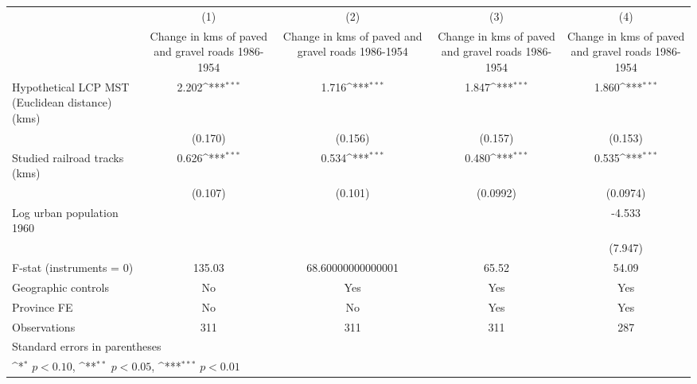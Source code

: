 {
\def\sym#1{\ifmmode^{#1}\else\(^{#1}\)\fi}
\begin{tabular}{l*{4}{c}}
\hline\hline
                &\multicolumn{1}{c}{(1)}&\multicolumn{1}{c}{(2)}&\multicolumn{1}{c}{(3)}&\multicolumn{1}{c}{(4)}\\
                &\multicolumn{1}{c}{Change in kms of paved and gravel roads 1986-1954}&\multicolumn{1}{c}{Change in kms of paved and gravel roads 1986-1954}&\multicolumn{1}{c}{Change in kms of paved and gravel roads 1986-1954}&\multicolumn{1}{c}{Change in kms of paved and gravel roads 1986-1954}\\
\hline
Hypothetical LCP MST (Euclidean distance)(kms)&    2.202\sym{***}&    1.716\sym{***}&    1.847\sym{***}&    1.860\sym{***}\\
                &  (0.170)         &  (0.156)         &  (0.157)         &  (0.153)         \\
[1em]
Studied railroad tracks (kms)&    0.626\sym{***}&    0.534\sym{***}&    0.480\sym{***}&    0.535\sym{***}\\
                &  (0.107)         &  (0.101)         & (0.0992)         & (0.0974)         \\
[1em]
Log urban population 1960&                  &                  &                  &   -4.533         \\
                &                  &                  &                  &  (7.947)         \\
\hline
F-stat (instruments = 0)&   135.03         &68.60000000000001         &    65.52         &    54.09         \\
Geographic controls&       No         &      Yes         &      Yes         &      Yes         \\
Province FE     &       No         &       No         &      Yes         &      Yes         \\
Observations    &      311         &      311         &      311         &      287         \\
\hline\hline
\multicolumn{5}{l}{\footnotesize Standard errors in parentheses}\\
\multicolumn{5}{l}{\footnotesize \sym{*} \(p<0.10\), \sym{**} \(p<0.05\), \sym{***} \(p<0.01\)}\\
\end{tabular}
}
